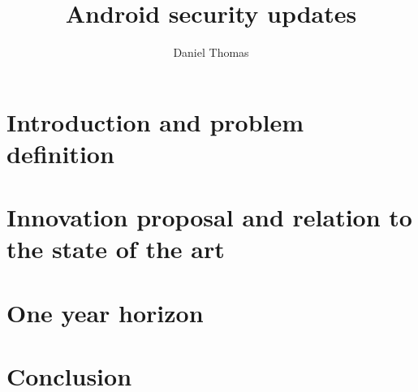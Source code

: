 \documentclass[a4paper,twocolumn]{article}
\author{Daniel Thomas}
\title{Android security updates}
\date{}%
\begin{document}
\maketitle

\section*{Introduction and problem definition}

\section*{Innovation proposal and relation to the state of the art}

\section*{One year horizon}

\section*{Conclusion}

\printbibliography
\end{document}

